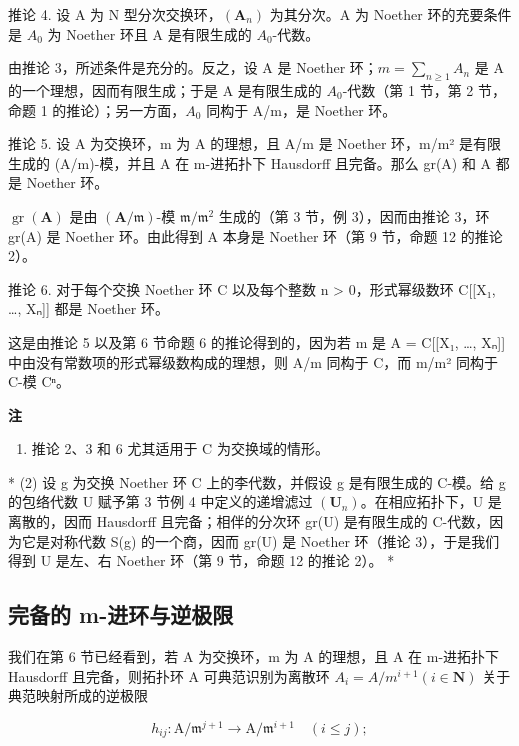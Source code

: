 	推论 4. 设 A 为 N 型分次交换环，\((\mathbf{A}_{n})\) 为其分次。A 为 Noether 环的充要条件是 \(A_{0}\) 为 Noether 环且 A 是有限生成的 \(A_{0}\)-代数。

	由推论 3，所述条件是充分的。反之，设 A 是 Noether 环；\(m = \sum_{n \geqslant 1} A_n\) 是 A 的一个理想，因而有限生成；于是 A 是有限生成的 \(A_0\)-代数（第 1 节，第 2 节，命题 1 的推论）；另一方面，\(A_0\) 同构于 A/m，是 Noether 环。

	推论 5. 设 A 为交换环，m 为 A 的理想，且 A/m 是 Noether 环，m/m² 是有限生成的 (A/m)-模，并且 A 在 m-进拓扑下 Hausdorff 且完备。那么 gr(A) 和 A 都是 Noether 环。

	\(\operatorname{gr}(\mathbf{A})\) 是由 \((\mathbf{A} / \mathfrak{m})\)-模 \(\mathfrak{m} / \mathfrak{m}^2\) 生成的（第 3 节，例 3），因而由推论 3，环 gr(A) 是 Noether 环。由此得到 A 本身是 Noether 环（第 9 节，命题 12 的推论 2）。

	推论 6. 对于每个交换 Noether 环 C 以及每个整数 n \textgreater{} 0，形式幂级数环 C{[}{[}X₁, \ldots, Xₙ{]}{]} 都是 Noether 环。

	这是由推论 5 以及第 6 节命题 6 的推论得到的，因为若 m 是 A = C{[}{[}X₁, \ldots, Xₙ{]}{]} 中由没有常数项的形式幂级数构成的理想，则 A/m 同构于 C，而 m/m² 同构于 C-模 Cⁿ。

\textbf{注}\par

\begin{enumerate}
\def\labelenumi{(\arabic{enumi})}
\tightlist
\item
	  推论 2、3 和 6 尤其适用于 C 为交换域的情形。
\end{enumerate}

	* (2) 设 g 为交换 Noether 环 C 上的李代数，并假设 g 是有限生成的 C-模。给 g 的包络代数 U 赋予第 3 节例 4 中定义的递增滤过 \((\mathbf{U}_{n})\)。在相应拓扑下，U 是离散的，因而 Hausdorff 且完备；相伴的分次环 gr(U) 是有限生成的 C-代数，因为它是对称代数 S(g) 的一个商，因而 gr(U) 是 Noether 环（推论 3），于是我们得到 U 是左、右 Noether 环（第 9 节，命题 12 的推论 2）。 *

\subsection{完备的 m-进环与逆极限}

	我们在第 6 节已经看到，若 A 为交换环，m 为 A 的理想，且 A 在 m-进拓扑下 Hausdorff 且完备，则拓扑环 A 可典范识别为离散环 \(A_{i} = A/m^{i+1} (i \in \mathbf{N})\) 关于典范映射所成的逆极限

\[
h _ {i j} \colon \mathrm{A} / \mathfrak {m} ^ {j + 1} \rightarrow \mathrm{A} / \mathfrak {m} ^ {i + 1} \quad (i \leqslant j);
\]

